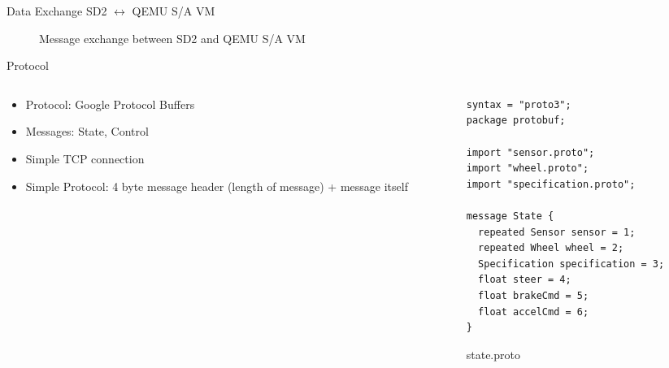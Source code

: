 \documentclass[aspectratio=169]{beamer}
\begin{document}
\begin{frame}{Data Exchange SD2 $\longleftrightarrow$ QEMU S/A VM}
  \begin{figure}
    \caption{\tiny Message exchange between SD2 and QEMU S/A VM}
  \end{figure}
\end{frame}

\begin{frame}[fragile]{Protocol}
  \begin{columns}
    \begin{column}{0.5\textwidth}
      \begin{itemize}
        \item Protocol: Google Protocol Buffers
        \item Messages: State, Control
        \item Simple TCP connection
        \item Simple Protocol: 4 byte message header (length of message) + message itself
      \end{itemize}
    \end{column}
    \begin{column}{0.5\textwidth}
      \begin{figure}
        \begin{verbatim}
syntax = "proto3";
package protobuf;

import "sensor.proto";
import "wheel.proto";
import "specification.proto";

message State {
  repeated Sensor sensor = 1;
  repeated Wheel wheel = 2;
  Specification specification = 3;
  float steer = 4;
  float brakeCmd = 5;
  float accelCmd = 6;
}
        \end{verbatim}
        \caption{\tiny state.proto}
      \end{figure}
    \end{column}
  \end{columns}
\end{frame}
\end{document}
